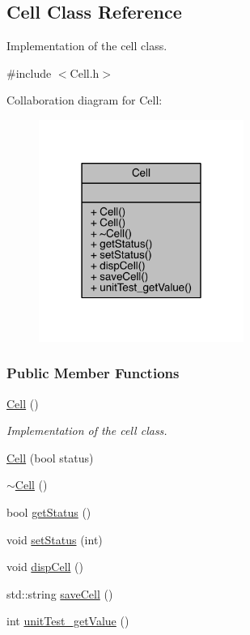\hypertarget{a00011}{}\subsection{Cell Class Reference}
\label{a00011}


Implementation of the cell class.  




{\ttfamily \#include $<$Cell.\+h$>$}



Collaboration diagram for Cell\+:\nopagebreak
\begin{figure}[H]
\begin{center}
\leavevmode
\includegraphics[width=190pt]{a00157}
\end{center}
\end{figure}
\subsubsection*{Public Member Functions}
\begin{DoxyCompactItemize}
\item 
\hyperlink{a00011_a394510643e8664cf12b5efaf5cb99f71}{Cell} ()
\begin{DoxyCompactList}\small\item\em Implementation of the cell class. \end{DoxyCompactList}\item 
\hyperlink{a00011_a8981f0dc5a0114fae2fdee856521b66f}{Cell} (bool status)
\item 
\hyperlink{a00011_a9fa559f7a28e2b4336c6879ca09304d8}{$\sim$\+Cell} ()
\item 
bool \hyperlink{a00011_ad68eea54b85d0770a60a509f7079690a}{get\+Status} ()
\item 
void \hyperlink{a00011_aea678ecbc500f5af13aa5b82ff6153ed}{set\+Status} (int)
\item 
void \hyperlink{a00011_ab72380c17ee53d09bd308595b706f33c}{disp\+Cell} ()
\item 
std\+::string \hyperlink{a00011_ac1aba9e02fa7bff15839f23772b9c07c}{save\+Cell} ()
\item 
int \hyperlink{a00011_ae45aada2a9c5e4c6eb30e4a55890825f}{unit\+Test\+\_\+get\+Value} ()
\end{DoxyCompactItemize}


